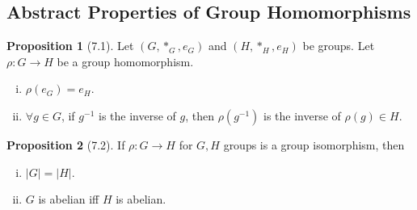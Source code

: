 \documentclass{article}
\newcommand{\func}[3]{#1: #2 \to #3}
\theoremstyle{definition}
\newtheorem*{prop}{Proposition}
\theoremstyle{remark}
\begin{document}
{        \subsection*{Abstract Properties of Group Homomorphisms}{
            \begin{prop}[7.1]
                Let $(G, *_G, e_G)$ and $(H, *_H, e_H)$ be groups. Let $\func{\rho}{G}{H}$ be a group homomorphism.
                \begin{enumerate}[i.]
                    \item $\rho(e_G)=e_H$.
                    \item $\forall g \in G$, if $g^{-1}$ is the inverse of $g$, then $\rho(g^{-1})$ is the inverse of $\rho(g) \in H$.
                \end{enumerate}
            \end{prop}
            
            \begin{prop}[7.2]
                If $\func{\rho}{G}{H}$ for $G, H$ groups is a group isomorphism, then
                \begin{enumerate}[i.]
                    \item $|G|=|H|$.
                    \item $G$ is abelian iff $H$ is abelian.
                \end{enumerate}
            \end{prop}
        
        }
    }
    
\end{document}
